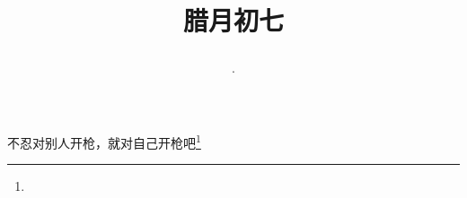 \title{\date[d=17,m=1,y=2024][year:cn-y,年,month:cn,day:cn,日,·,weekday]·腊月初七 }
不忍对别人开枪，就对自己开枪吧\footnote{ }

